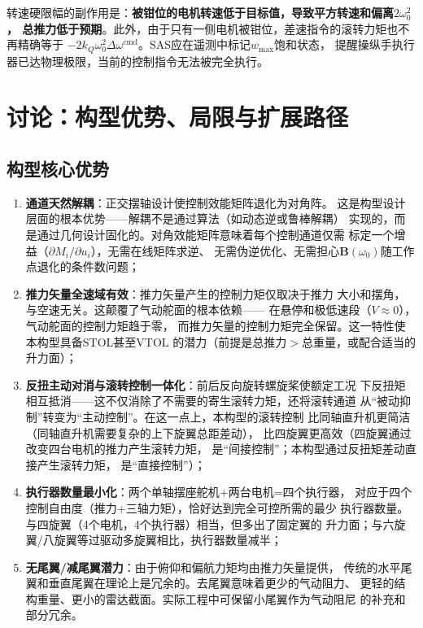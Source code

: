 \documentclass[a4paper,12pt]{ctexart}
\theoremstyle{plain}
\theoremstyle{definition}
\begin{document}
转速硬限幅的副作用是：\textbf{被钳位的电机转速低于目标值，导致平方转速和偏离$2\omega_0^2$，
总推力低于预期}。此外，由于只有一侧电机被钳位，差速指令的滚转力矩也不再精确等于
$-2k_Q\omega_0^2\Delta\omega^{\text{cmd}}$。SAS应在遥测中标记$w_{\max}$饱和状态，
提醒操纵手执行器已达物理极限，当前的控制指令无法被完全执行。

\section{讨论：构型优势、局限与扩展路径}
\label{sec:discussion}

\subsection{构型核心优势}

\begin{enumerate}[label=(\arabic*)]
    \item \textbf{通道天然解耦}：正交摆轴设计使控制效能矩阵退化为对角阵。
          这是构型设计层面的根本优势——解耦不是通过算法（如动态逆或鲁棒解耦）
          实现的，而是通过几何设计固化的。对角效能矩阵意味着每个控制通道仅需
          标定一个增益（$\partial M_i / \partial u_i$），无需在线矩阵求逆、
          无需伪逆优化、无需担心$\bm{B}(\omega_0)$随工作点退化的条件数问题；
    \item \textbf{推力矢量全速域有效}：推力矢量产生的控制力矩仅取决于推力
          大小和摆角，与空速无关。这颠覆了气动舵面的根本依赖——
          在悬停和极低速段（$V \approx 0$），气动舵面的控制力矩趋于零，
          而推力矢量的控制力矩完全保留。这一特性使本构型具备STOL甚至VTOL
          的潜力（前提是总推力$>$总重量，或配合适当的升力面）；
    \item \textbf{反扭主动对消与滚转控制一体化}：前后反向旋转螺旋桨使额定工况
          下反扭矩相互抵消——这不仅消除了不需要的寄生滚转力矩，还将滚转通道
          从“被动抑制”转变为“主动控制”。在这一点上，本构型的滚转控制
          比同轴直升机更简洁（同轴直升机需要复杂的上下旋翼总距差动），
          比四旋翼更高效（四旋翼通过改变四台电机的推力产生滚转力矩，
          是“间接控制”；本构型通过反扭矩差动直接产生滚转力矩，
          是“直接控制”）；
    \item \textbf{执行器数量最小化}：两个单轴摆座舵机+两台电机=四个执行器，
          对应于四个控制自由度（推力+三轴力矩），恰好达到完全可控所需的最少
          执行器数量。与四旋翼（4个电机，4个执行器）相当，但多出了固定翼的
          升力面；与六旋翼/八旋翼等过驱动多旋翼相比，执行器数量减半；
    \item \textbf{无尾翼/减尾翼潜力}：由于俯仰和偏航力矩均由推力矢量提供，
          传统的水平尾翼和垂直尾翼在理论上是冗余的。去尾翼意味着更少的气动阻力、
          更轻的结构重量、更小的雷达截面。实际工程中可保留小尾翼作为气动阻尼
          的补充和部分冗余。
\end{enumerate}
\end{document}
